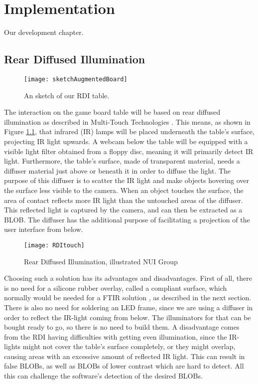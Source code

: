 
\chapter{Implementation}\label{ch:implementation}
Our development chapter. 

\section{Rear Diffused Illumination} \label{sec:RDI}
\begin{figure}[!h]
\centering	\texttt{[image: sketchAugmentedBoard]}
 \caption{An sketch of our RDI table.\label{Fig:sketch}}
\end{figure}
The interaction on the game board table will be based on rear diffused illumination as described in Multi-Touch Technologies \citep{multiTT}. This means, as shown in Figure \ref{Fig:sketch}, that infrared (IR) lamps will be placed underneath the table's surface, projecting IR light upwards. A webcam below the table will be equipped with a visible light filter obtained from a floppy disc, meaning it will primarily detect IR light. Furthermore, the table's surface, made of transparent material, needs a diffuser material just above or beneath it in order to diffuse the light. The purpose of this diffuser is to scatter the IR light and make objects hovering over the surface less visible to the camera. When an object touches the surface, the area of contact reflects more IR light than the untouched areas of the diffuser. This reflected light is captured by the camera, and can then be extracted as a BLOB. The diffuser has the additional purpose of facilitating a projection of the user interface from below.

\begin{figure}[!h]
\centering	\texttt{[image: RDItouch]}
 \caption{Rear Diffused Illumination, illustrated NUI Group \citep{multiTT}\label{Fig:RDI}}
\end{figure}

Choosing such a solution has its advantages and disadvantages. First of all, there is no need for a silicone rubber overlay, called a compliant surface, which normally would be needed for a FTIR solution \citep{multiTT}, as described in the next section. There is also no need for soldering an LED frame, since we are using a diffuser in order to reflect the IR-light coming from below. The illuminators for that can be bought ready to go, so there is no need to build them. A disadvantage comes from the RDI having difficulties with getting even illumination, since the IR-lights might not cover the table's surface completely, or they might overlap, causing areas with an excessive amount of reflected IR light. This can result in false BLOBs, as well as BLOBs of lower contrast which are hard to detect. All this can challenge the software's detection of the desired BLOBs.

